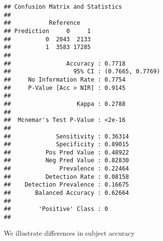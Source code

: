 \documentclass[
]{article}
\newenvironment{Shaded}{\begin{snugshade}}{\end{snugshade}}
\newcommand{\AttributeTok}[1]{\textcolor[rgb]{0.77,0.63,0.00}{#1}}
\newcommand{\DecValTok}[1]{\textcolor[rgb]{0.00,0.00,0.81}{#1}}
\newcommand{\FloatTok}[1]{\textcolor[rgb]{0.00,0.00,0.81}{#1}}
\newcommand{\FunctionTok}[1]{\textcolor[rgb]{0.00,0.00,0.00}{#1}}
\newcommand{\NormalTok}[1]{#1}
\newcommand{\OtherTok}[1]{\textcolor[rgb]{0.56,0.35,0.01}{#1}}
\newcommand{\SpecialCharTok}[1]{\textcolor[rgb]{0.00,0.00,0.00}{#1}}
\begin{document}
\begin{Shaded}
\end{Shaded}

\begin{verbatim}
## Confusion Matrix and Statistics
## 
##           Reference
## Prediction     0     1
##          0  2043  2133
##          1  3583 17285
##                                           
##                Accuracy : 0.7718          
##                  95% CI : (0.7665, 0.7769)
##     No Information Rate : 0.7754          
##     P-Value [Acc > NIR] : 0.9145          
##                                           
##                   Kappa : 0.2788          
##                                           
##  Mcnemar's Test P-Value : <2e-16          
##                                           
##             Sensitivity : 0.36314         
##             Specificity : 0.89015         
##          Pos Pred Value : 0.48922         
##          Neg Pred Value : 0.82830         
##              Prevalence : 0.22464         
##          Detection Rate : 0.08158         
##    Detection Prevalence : 0.16675         
##       Balanced Accuracy : 0.62664         
##                                           
##        'Positive' Class : 0               
## 
\end{verbatim}

We illustrate differences in subject accuracy
\end{document}
